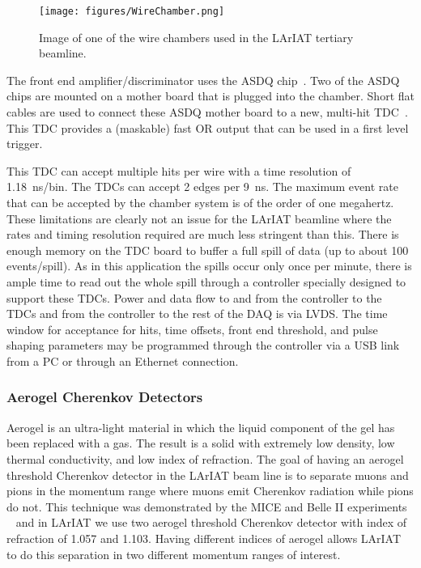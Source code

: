 \begin{figure}[!h]
\begin{centering}
\vspace{-0.3cm}
\texttt{[image: figures/WireChamber.png]}
\caption{
{\scriptsize \sf Image of one of the wire chambers used in the LArIAT tertiary beamline.}
}
\label{fig:wirechamber}
\end{centering}
\end{figure}

The front end amplifier/discriminator uses the ASDQ chip~\cite{ASDQchip}. Two of the ASDQ chips are mounted on a mother board that is plugged into the chamber.  Short flat cables are used to connect these ASDQ mother board to a new, multi-hit TDC~\cite{Sten}. This TDC provides a (maskable) fast OR output that can be used in a first level trigger. 

This TDC can accept multiple hits per wire with a time resolution of 1.18~ns/bin.  The TDCs can accept 2 edges per 9~ns.  The maximum event rate that can be accepted by the chamber system is of the order of one megahertz.  These limitations are clearly not an issue for the LArIAT beamline where the rates and timing resolution required are much less stringent than this.  There is enough memory on the TDC board to buffer a full spill of data (up to about 100 events/spill).  As in this application the spills occur only once per minute, there is ample time to read out the whole spill through a controller specially designed to support these TDCs.  Power and data flow to and from the controller to the TDCs and from the controller to the rest of the DAQ is via LVDS.  The time window for acceptance for hits, time offsets, front end threshold, and pulse shaping parameters may be programmed through the controller via a USB link from a PC or through an Ethernet connection.
 

\subsubsection{Aerogel Cherenkov Detectors}\label{sec:Aerogel}

Aerogel is an ultra-light material in which the liquid component of the gel has been replaced with a gas. The result is a solid with extremely low density, low thermal conductivity, and low index of refraction. The goal of having an aerogel threshold Cherenkov detector in the LArIAT beam line is to separate muons and pions in the momentum range where muons emit Cherenkov radiation while pions do not. This technique was demonstrated by the MICE and Belle II experiments ~\cite{MICE-aerogel,BelleII-aerogel} and in LArIAT we use two aerogel threshold Cherenkov detector with index of refraction of 1.057 and 1.103. Having different indices of aerogel allows LArIAT to do this separation in two different momentum ranges of interest.


